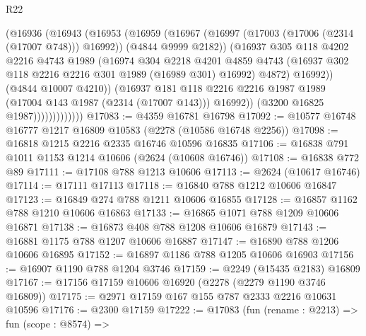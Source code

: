 \begin{lexlean}{R22}
\begin{coremodule}
                          (@16936
                            (@16943
                              (@16953
                                (@16959
                                  (@16967
                                    (@16997 (@17003 (@17006 (@2314 (@17007 @748))) @16992))
                                    (@4844 @9999 @2182))
                                  (@16937
                                    @305
                                    @118
                                    @4202
                                    @2216
                                    @4743
                                    @1989
                                    (@16974
                                      @304
                                      @2218
                                      @4201
                                      @4859
                                      @4743
                                      (@16937 @302 @118 @2216 @2216 @301 @1989 (@16989 @301) @16992)
                                      @4872)
                                    @16992))
                                (@4844 @10007 @4210))
                              (@16937
                                @181
                                @118
                                @2216
                                @2216
                                @1987
                                @1989
                                (@17004 @143 @1987 (@2314 (@17007 @143)))
                                @16992))
                            (@3200 @16825 @1987)))))))))))))
@17083 := @4359 @16781 @16798
@17092 := @10577 @16748 @16777 @1217 @16809 @10583 (@2278 (@10586 @16748 @2256))
@17098 := @16818 @1215 @2216 @2335 @16746 @10596 @16835
@17106 := @16838 @791 @1011 @1153 @1214 @10606 (@2624 (@10608 @16746))
@17108 := @16838 @772 @89
@17111 := @17108 @788 @1213 @10606
@17113 := @2624 (@10617 @16746)
@17114 := @17111 @17113
@17118 := @16840 @788 @1212 @10606 @16847
@17123 := @16849 @274 @788 @1211 @10606 @16855
@17128 := @16857 @1162 @788 @1210 @10606 @16863
@17133 := @16865 @1071 @788 @1209 @10606 @16871
@17138 := @16873 @408 @788 @1208 @10606 @16879
@17143 := @16881 @1175 @788 @1207 @10606 @16887
@17147 := @16890 @788 @1206 @10606 @16895
@17152 := @16897 @1186 @788 @1205 @10606 @16903
@17156 := @16907 @1190 @788 @1204 @3746
@17159 := @2249 (@15435 @2183) @16809
@17167 := @17156 @17159 @10606 @16920 (@2278 (@2279 @1190 @3746 @16809))
@17175 := @2971 @17159 @167 @155 @787 @2333 @2216 @10631 @10596
@17176 := @2300 @17159
@17222 := @17083
    (fun (rename : @2213) =>
    fun (scope : @8574) =>

\end{coremodule}
\end{lexlean}
